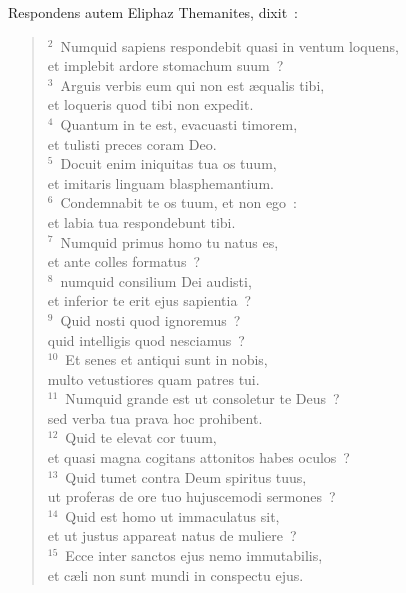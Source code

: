 \lettrine[lines=3,image=true,loversize=0.05,lraise=-0.03]{R}{}espondens autem Eliphaz Themanites, dixit~:
\begin{flushleft}\begin{verse}\vspace{6pt}${}^{2}$~Numquid sapiens respondebit quasi in ventum loquens,\\ et implebit ardore stomachum suum~?\\
${}^{3}$~Arguis verbis eum qui non est \ae qualis tibi,\\ et loqueris quod tibi non expedit.\\
${}^{4}$~Quantum in te est, evacuasti timorem,\\ et tulisti preces coram Deo.\\
${}^{5}$~Docuit enim iniquitas tua os tuum,\\ et imitaris linguam blasphemantium.\\
${}^{6}$~Condemnabit te os tuum, et non ego~:\\ et labia tua respondebunt tibi.\\
${}^{7}$~Numquid primus homo tu natus es,\\ et ante colles formatus~?\\
${}^{8}$~numquid consilium Dei audisti,\\ et inferior te erit ejus sapientia~?\\
${}^{9}$~Quid nosti quod ignoremus~?\\ quid intelligis quod nesciamus~?\\
${}^{10}$~Et senes et antiqui sunt in nobis,\\ multo vetustiores quam patres tui.\\
${}^{11}$~Numquid grande est ut consoletur te Deus~?\\ sed verba tua prava hoc prohibent.\\
${}^{12}$~Quid te elevat cor tuum,\\ et quasi magna cogitans attonitos habes oculos~?\\
${}^{13}$~Quid tumet contra Deum spiritus tuus,\\ ut proferas de ore tuo hujuscemodi sermones~?\\
${}^{14}$~Quid est homo ut immaculatus sit,\\ et ut justus appareat natus de muliere~?\\
${}^{15}$~Ecce inter sanctos ejus nemo immutabilis,\\ et c\ae li non sunt mundi in conspectu ejus.\\

\end{verse}
\end{flushleft}
